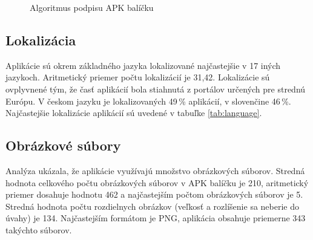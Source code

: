\begin{figure}[!htbp]
\centering
{}
\label{fig:signAlg}
\caption{Algoritmus podpisu APK balíčku}
\end{figure}

\subsection*{Lokalizácia}
Aplikácie sú okrem základného jazyka lokalizované najčastejšie v 17 iných jazykoch. Aritmetický priemer počtu lokalizácií je 31,42. Lokalizácie sú ovplyvnené tým, že časť aplikácií bola stiahnutá z portálov určených pre strednú Európu. V českom jazyku je lokalizovaných 49\,\% aplikácií, v slovenčine 46\,\%. Najčastejšie lokalizácie aplikácií sú uvedené v tabuľke \ref{tab:language}.


\subsection*{Obrázkové súbory}
Analýza ukázala, že aplikácie využívajú množstvo obrázkových súborov. Stredná hodnota celkového počtu obrázkových súborov v APK balíčku je 210, aritmetický priemer dosahuje hodnotu 462 a najčastejším počtom obrázkových súborov je 5. Stredná hodnota počtu rozdielnych obrázkov (veľkosť a rozlíšenie sa neberie do úvahy) je 134. Najčastejším formátom je PNG, aplikácia obsahuje priemerne 343 takýchto súborov.